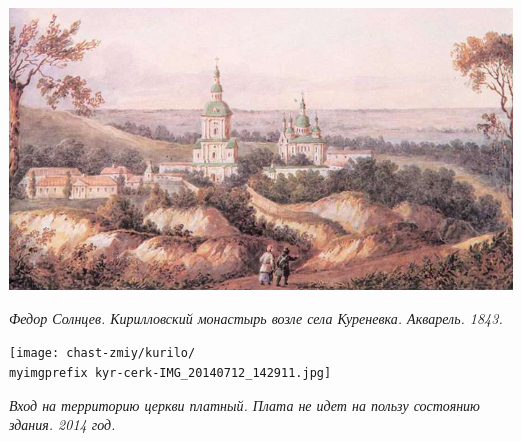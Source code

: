 \begin{center}
\includegraphics[width=\linewidth]{chast-zmiy/kurilo/Solncev_Kirilovskii_monastir_vozle_sela_Kyrenevka.jpg}

\textit{Федор Солнцев. Кирилловский монастырь возле села Куреневка. Акварель. 1843.}
\end{center}

\begin{center}
\texttt{[image: chast-zmiy/kurilo/\\myimgprefix kyr-cerk-IMG\_20140712\_142911.jpg]}

\textit{Вход на территорию церкви платный. Плата не идет на пользу состоянию здания. 2014 год.}
\end{center}

